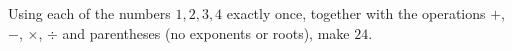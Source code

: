 Using each of the numbers $1,2,3,4$ exactly once, together with the operations $+$, $-$, $\times$, $\div$ and parentheses (no exponents or roots), make $24$.
